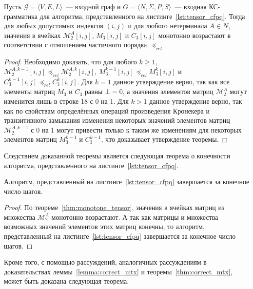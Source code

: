 \begin{theorem}\label{thm:monotone_tensor}
	Пусть $\mathcal{G} = \langle V, E, L \rangle$~--- входной граф и $G = \langle N, \Sigma, P, S \rangle$~--- входная КС-грамматика для алгоритма, представленного на листинге~\ref{lst:tensor_cfpq}. Тогда для любых допустимых индексов $(i, j)$ и для любого нетерминала $A \in N$, значения в ячейках $\mathcal{M}_2^{A}[i, j]$, $M_3[i, j]$ и $C_3[i, j]$ монотонно возрастают в соответствии с отношением частичного порядка $\preceq_{\textit{rel}}$.
\end{theorem}
\begin{proof}
Необходимо доказать, что для любого $k \geq 1$, $\mathcal{M}_2^{A, k - 1}[i, j] \preceq_{\textit{rel}} \mathcal{M}_2^{A, k}[i, j]$,  $M_3^{k - 1}[i, j] \preceq_{\textit{rel}} M_3^{k}[i, j]$ и $C_3^{k - 1}[i, j] \preceq_{\textit{rel}} C_3^{k}[i, j]$. Для $k = 1$ данное утверждение верно, так как все элементы матриц $M_3$ и $C_3$ равны $\bot = 0$, а значения элементов матриц $\mathcal{M}_2^{A}$ могут изменится лишь в строке 18 с 0 на 1. Для $k > 1$ данное утверждение верно, так как по свойствам определённых операций произведения Кронекера и транзитивного замыкания изменения некоторых значений элементов матриц $\mathcal{M}_2^{A, k - 1}$ с 0 на 1 могут привести только к таким же изменениям для некоторых элементов матриц $M_3^{k - 1}$ и $C_3^{k - 1}$, что доказывает утверждение теоремы.
\end{proof}

Следствием доказанной теоремы является следующая теорема о конечности алгоритма, представленного на листинге~\ref{lst:tensor_cfpq}.

\begin{theorem}\label{thm:finite_tensor}
	Алгоритм, представленный на листинге~\ref{lst:tensor_cfpq} завершается за конечное число шагов.
\end{theorem}
\begin{proof}
По теореме~\ref{thm:monotone_tensor}, значения в ячейках матриц из множества $\mathcal{M}_2^{A}$ монотонно возрастают. А так как матрицы и множества возможных значений элементов этих матриц конечны, то алгоритм, представленный на листинге~\ref{lst:tensor_cfpq} завершается за конечное число шагов.
\end{proof}

Кроме того, с помощью рассуждений, аналогичных рассуждениям в доказательствах леммы~\ref{lemma:correct_mtx} и теоремы~\ref{thm:correct_mtx}, может быть доказана следующая теорема.

